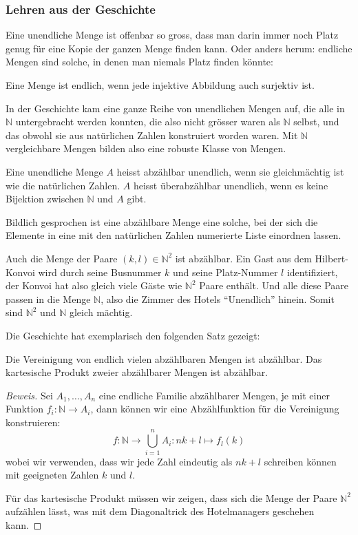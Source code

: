 \subsubsection{Lehren aus der Geschichte}
Eine unendliche Menge ist offenbar so gross, dass man darin immer noch
Platz genug für eine Kopie der ganzen Menge finden kann. Oder anders
herum: endliche Mengen sind solche, in denen man niemals Platz finden
könnte:

\begin{satz}
Eine Menge ist endlich, wenn jede injektive Abbildung auch surjektiv ist.
\end{satz}

In der Geschichte kam eine ganze Reihe von unendlichen Mengen auf, die
alle in $\mathbb N$ untergebracht werden konnten, die also nicht
grösser waren als $\mathbb N$ selbst, und das obwohl sie aus natürlichen
Zahlen konstruiert worden waren. Mit $\mathbb N$ vergleichbare Mengen
bilden also eine robuste Klasse von Mengen.

\begin{definition}
%
%
Eine unendliche Menge $A$ heisst abzählbar unendlich, wenn sie
gleichmächtig ist wie die natürlichen Zahlen. $A$ heisst
überabzählbar unendlich, wenn es keine Bijektion zwischen
$\mathbb N$ und $A$ gibt.
\end{definition}
Bildlich gesprochen ist eine abzählbare Menge eine solche,
bei der sich die Elemente in eine mit den natürlichen Zahlen numerierte
Liste einordnen lassen.

Auch die Menge der Paare $(k,l)\in \mathbb N^2$ ist abzählbar.
Ein Gast aus dem Hilbert-Konvoi wird durch seine Busnummer $k$ und
seine Platz-Nummer $l$ identifiziert, der Konvoi hat also gleich
viele Gäste wie $\mathbb N^2$ Paare enthält. Und alle diese Paare
passen in die Menge $\mathbb N$, also die Zimmer des Hotels ``Unendlich''
hinein. Somit sind $\mathbb N^2$ und $\mathbb N$ gleich mächtig.

Die Geschichte hat exemplarisch den folgenden Satz gezeigt:

\begin{satz}Die Vereinigung von endlich vielen abzählbaren
Mengen ist abzählbar. Das kartesische Produkt zweier abzählbarer
Mengen ist abzählbar.
\end{satz}

\begin{proof}[Beweis]
Sei $A_1,\dots,A_n$ eine endliche Familie abzählbarer Mengen,
je mit einer Funktion $f_i\colon \mathbb N\to A_i$, dann
können wir eine Abzählfunktion für die Vereinigung konstruieren:
\[
f\colon \mathbb N\to\bigcup_{i=1}^n A_i\colon nk+l \mapsto f_l(k)
\]
wobei wir verwenden, dass wir jede Zahl eindeutig als $nk+l$
schreiben können mit geeigneten Zahlen $k$ und $l$.

Für das kartesische Produkt müssen wir zeigen, dass sich die
Menge der Paare $\mathbb N^2$ aufzählen lässt, was mit dem
Diagonaltrick des Hotelmanagers geschehen kann.
\end{proof}

